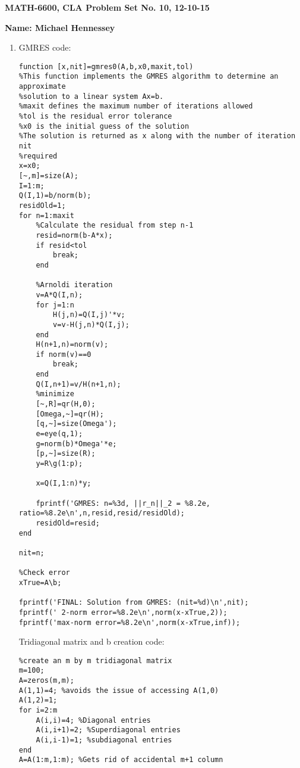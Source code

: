 \documentclass[12pt]{article}
\numberwithin{equation}{section}
\begin{document}
{\large\bf MATH-6600, CLA Problem Set No. 10, 12-10-15}



\vspace{6 ex}

{\bf Name: Michael Hennessey} \hfill

\vspace{6 ex}

\begin{enumerate}
\item GMRES code:\\

\begin{lstlisting}
function [x,nit]=gmres0(A,b,x0,maxit,tol)
%This function implements the GMRES algorithm to determine an approximate
%solution to a linear system Ax=b.
%maxit defines the maximum number of iterations allowed
%tol is the residual error tolerance
%x0 is the initial guess of the solution
%The solution is returned as x along with the number of iteration nit
%required
x=x0;
[~,m]=size(A);
I=1:m;
Q(I,1)=b/norm(b);
residOld=1;
for n=1:maxit
    %Calculate the residual from step n-1
    resid=norm(b-A*x);
    if resid<tol
        break;
    end

    %Arnoldi iteration
    v=A*Q(I,n);
    for j=1:n
        H(j,n)=Q(I,j)'*v;
        v=v-H(j,n)*Q(I,j);
    end
    H(n+1,n)=norm(v);
    if norm(v)==0
        break;
    end
    Q(I,n+1)=v/H(n+1,n);
    %minimize
    [~,R]=qr(H,0);
    [Omega,~]=qr(H);
    [q,~]=size(Omega');
    e=eye(q,1);
    g=norm(b)*Omega'*e;
    [p,~]=size(R);
    y=R\g(1:p);

    x=Q(I,1:n)*y;

    fprintf('GMRES: n=%3d, ||r_n||_2 = %8.2e, ratio=%8.2e\n',n,resid,resid/residOld);
    residOld=resid;
end

nit=n;

%Check error
xTrue=A\b;

fprintf('FINAL: Solution from GMRES: (nit=%d)\n',nit);
fprintf(' 2-norm error=%8.2e\n',norm(x-xTrue,2));
fprintf('max-norm error=%8.2e\n',norm(x-xTrue,inf));
\end{lstlisting}

Tridiagonal matrix and b creation code:

\begin{lstlisting}
%create an m by m tridiagonal matrix
m=100;
A=zeros(m,m);
A(1,1)=4; %avoids the issue of accessing A(1,0)
A(1,2)=1;
for i=2:m
    A(i,i)=4; %Diagonal entries
    A(i,i+1)=2; %Superdiagonal entries
    A(i,i-1)=1; %subdiagonal entries
end
A=A(1:m,1:m); %Gets rid of accidental m+1 column


\end{lstlisting}
\end{enumerate}
\end{document}
